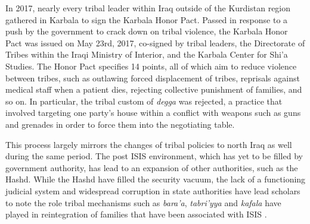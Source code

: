 



In 2017, nearly every tribal leader within Iraq outside of the Kurdistan region gathered in Karbala to sign the Karbala Honor Pact. Passed in response to a push by the government to crack down on tribal violence, the Karbala Honor Pact was issued on May 23rd, 2017, co-signed by tribal leaders, the Directorate of Tribes within the Iraqi Ministry of Interior, and the Karbala Center for Shi'a Studies. The Honor Pact specifies 14 points, all of which aim to reduce violence between tribes, such as outlawing forced displacement of tribes, reprisals against medical staff when a patient dies, rejecting collective punishment of families, and so on. In particular, the tribal custom of \emph{degga} was rejected, a practice that involved targeting one party's house within a conflict with weapons such as guns and grenades in order to force them into the negotiating table. 

This process largely mirrors the changes of tribal policies to north Iraq as well during the same period. The post ISIS environment, which has yet to be filled by government authority, has lead to an expansion of other authorities, such as the Hashd. While the Hashd have filled the security vacuum, the lack of a functioning judicial system and widespread corruption in state authorities have lead scholars to note the role tribal mechanisms such as \emph{bara'a}, \emph{tabri'yya} and \emph{kafala} have played in reintegration of families that have been associated with ISIS \cite{genat_state_nodate}.

